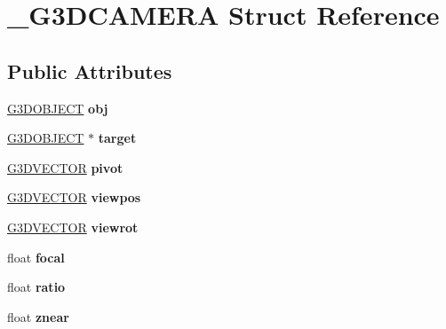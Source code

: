 \hypertarget{struct__G3DCAMERA}{}\section{\+\_\+\+G3\+D\+C\+A\+M\+E\+RA Struct Reference}
\label{struct__G3DCAMERA}
\subsection*{Public Attributes}
\begin{DoxyCompactItemize}
\item 
\mbox{\label{struct__G3DCAMERA_aafbd6b70e3854d2521545b8efaef0d9d}} 
\hyperlink{struct__G3DOBJECT}{G3\+D\+O\+B\+J\+E\+CT} {\bfseries obj}
\item 
\mbox{\label{struct__G3DCAMERA_a934f59b0de4a4a69db4ab7d5bba7c649}} 
\hyperlink{struct__G3DOBJECT}{G3\+D\+O\+B\+J\+E\+CT} $\ast$ {\bfseries target}
\item 
\mbox{\label{struct__G3DCAMERA_a0e7944e18aea56881f81751a7c41aba0}} 
\hyperlink{struct__G3DVECTOR}{G3\+D\+V\+E\+C\+T\+OR} {\bfseries pivot}
\item 
\mbox{\label{struct__G3DCAMERA_aeccab6f2b31087755cf274501cecf85f}} 
\hyperlink{struct__G3DVECTOR}{G3\+D\+V\+E\+C\+T\+OR} {\bfseries viewpos}
\item 
\mbox{\label{struct__G3DCAMERA_adcfbbc514b11f52ee0ab27e88f91ff5d}} 
\hyperlink{struct__G3DVECTOR}{G3\+D\+V\+E\+C\+T\+OR} {\bfseries viewrot}
\item 
\mbox{\label{struct__G3DCAMERA_adba6389e8302ce744cf539b8ee94393c}} 
float {\bfseries focal}
\item 
\mbox{\label{struct__G3DCAMERA_ae30b3fb99716f0f4a9e2cda650a5a108}} 
float {\bfseries ratio}
\item 
\mbox{\label{struct__G3DCAMERA_a04b75b168d96a0f8ba56c9b5a53ffc75}} 
float {\bfseries znear}
\item 
\mbox{\label{struct__G3DCAMERA_aa81fe196c2e3033b340b71fa40b633a1}} 

\end{DoxyCompactItemize}
